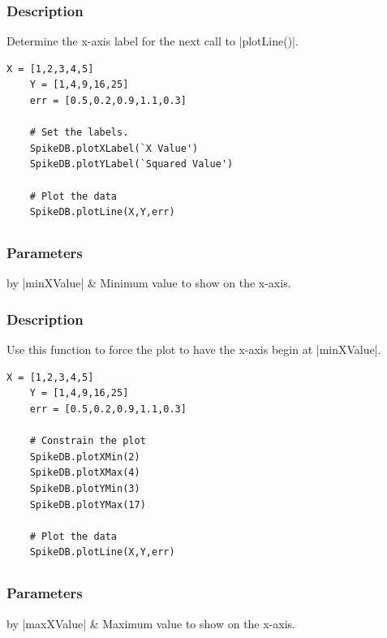 \documentclass{report}
\begin{document}
\subsubsection{Description}
Determine the x-axis label for the next call to |plotLine()|.
\begin{lstlisting}[caption=Example]
	X = [1,2,3,4,5]
	Y = [1,4,9,16,25]
	err = [0.5,0.2,0.9,1.1,0.3]

	# Set the labels.
	SpikeDB.plotXLabel(`X Value')
	SpikeDB.plotYLabel(`Squared Value')

	# Plot the data
	SpikeDB.plotLine(X,Y,err)
\end{lstlisting}


\clearpage
\subsection[\method{void}{plotXMin}]{}
\subsubsection{Parameters}
\begin{table}[h]
\begin{center}
\begin{tabular}{by}
		|minXValue| & Minimum value to show on the x-axis.\\
	\end{tabular}
\end{center}
\end{table}
\subsubsection{Description}
Use this function to force the plot to have the x-axis begin at |minXValue|.
\begin{lstlisting}[caption=Example]
	X = [1,2,3,4,5]
	Y = [1,4,9,16,25]
	err = [0.5,0.2,0.9,1.1,0.3]

	# Constrain the plot
	SpikeDB.plotXMin(2)
	SpikeDB.plotXMax(4)
	SpikeDB.plotYMin(3)
	SpikeDB.plotYMax(17)

	# Plot the data
	SpikeDB.plotLine(X,Y,err)
\end{lstlisting}

\clearpage
\subsection[\method{void}{plotXMax}]{}
\subsubsection{Parameters}
\begin{table}[h]
\begin{center}
\begin{tabular}{by}
		|maxXValue| & Maximum value to show on the x-axis.\\
	\end{tabular}
\end{center}
\end{table}
\end{document}
